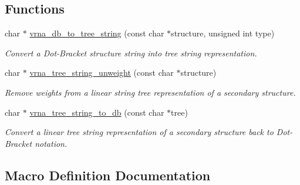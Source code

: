 \subsection*{Functions}
\begin{DoxyCompactItemize}
\item 
char $\ast$ \hyperlink{group__struct__utils__tree_ga56551ab7da64933a7230d29430f40cfe}{vrna\+\_\+db\+\_\+to\+\_\+tree\+\_\+string} (const char $\ast$structure, unsigned int type)
\begin{DoxyCompactList}\small\item\em Convert a Dot-\/\+Bracket structure string into tree string representation. \end{DoxyCompactList}\item 
char $\ast$ \hyperlink{group__struct__utils__tree_gaa31da26a3f582ddc35a84ff1b9c0a2b0}{vrna\+\_\+tree\+\_\+string\+\_\+unweight} (const char $\ast$structure)
\begin{DoxyCompactList}\small\item\em Remove weights from a linear string tree representation of a secondary structure. \end{DoxyCompactList}\item 
char $\ast$ \hyperlink{group__struct__utils__tree_ga99d280319a7fd3f87e9f0d8c44520774}{vrna\+\_\+tree\+\_\+string\+\_\+to\+\_\+db} (const char $\ast$tree)
\begin{DoxyCompactList}\small\item\em Convert a linear tree string representation of a secondary structure back to Dot-\/\+Bracket notation. \end{DoxyCompactList}\end{DoxyCompactItemize}


\subsection{Macro Definition Documentation}
\mbox{\label{group__struct__utils__tree_ga3ad5609bc93ef20034c3ab989365c1f0}} 

